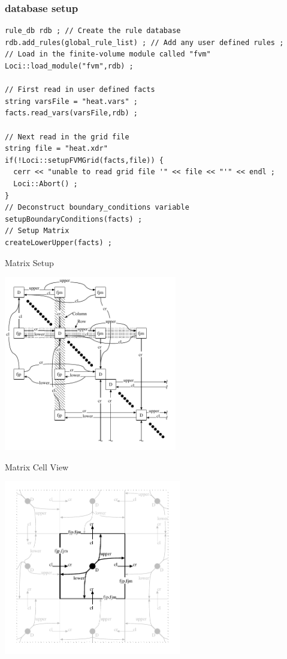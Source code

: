 \documentclass{beamer}
\begin{document}
\begin{frame}[fragile=singleslide]\frametitle{database setup}
\scriptsize
\begin{verbatim}
rule_db rdb ; // Create the rule database
rdb.add_rules(global_rule_list) ; // Add any user defined rules ;
// Load in the finite-volume module called "fvm"
Loci::load_module("fvm",rdb) ;

// First read in user defined facts
string varsFile = "heat.vars" ;
facts.read_vars(varsFile,rdb) ;

// Next read in the grid file
string file = "heat.xdr"
if(!Loci::setupFVMGrid(facts,file)) {
  cerr << "unable to read grid file '" << file << "'" << endl ;
  Loci::Abort() ;
}
// Deconstruct boundary_conditions variable
setupBoundaryConditions(facts) ;
// Setup Matrix
createLowerUpper(facts) ;
\end{verbatim}
\end{frame}
\begin{frame}{Matrix Setup}
\begin{center}
\includegraphics[height=3in]{mat}
\end{center}
\end{frame}
\begin{frame}{Matrix Cell View}
\begin{center}
\includegraphics[height=3in]{cell}
\end{center}
\end{frame}
\end{document}
